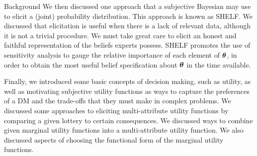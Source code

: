 \begin{chapter}{Background \label{Ch:background}}
We then discussed one approach that a subjective Bayesian may use to elicit a (joint) probability distribution. This approach is known as SHELF. We discussed that elicitation is useful when there is a lack of relevant data, although it is not a trivial procedure. We must take great care to elicit an honest and faithful representation of the beliefs experts possess. SHELF promotes the use of sensitivity analysis to gauge the relative importance of each element of $\bm{\theta}$, in order to obtain the most useful belief specification about $\bm{\theta}$ in the time available.

Finally, we introduced some basic concepts of decision making, such as utility, as well as motivating subjective utility functions as ways to capture the preferences of a DM and the trade-offs that they must make in complex problems. We discussed some approaches to eliciting multi-attribute utility functions by comparing a given lottery to certain consequences. We discussed ways to combine given marginal utility functions into a multi-attribute utility function. We also discussed aspects of choosing the functional form of the marginal utility functions.
\end{chapter}
